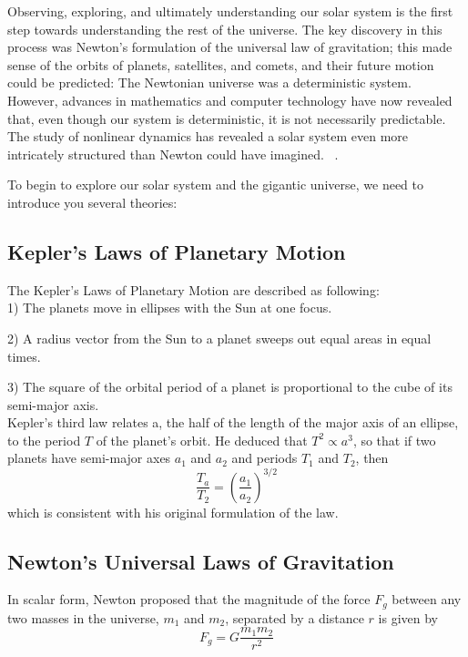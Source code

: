 Observing, exploring, and ultimately understanding our solar system is the first step towards understanding the rest of the universe. The key discovery in this process was Newton’s formulation of the universal law of gravitation; this made sense of the orbits of planets, satellites, and comets, and their future motion could be predicted: The Newtonian universe was a deterministic system. However, advances in mathematics and computer technology have now revealed that, even though our system is deterministic, it is not necessarily predictable. The study of nonlinear dynamics has revealed a solar system even more intricately structured than Newton could have imagined. ~\cite{99MurraySolarSys}.

To begin to explore our solar system and the gigantic universe, we need to introduce you several theories:

\subsection{Kepler's Laws of Planetary Motion}
\label{Kepler's Laws}
The Kepler's Laws of Planetary Motion are described as following: \\

1) The planets move in ellipses with the Sun at one focus.

2) A radius vector from the Sun to a planet sweeps out equal areas in
equal times.\label{Kepler Second Law}

3) The square of the orbital period of a planet is proportional to the cube of its semi-major axis. \\

Kepler’s third law relates a, the half of the length of the major axis of an ellipse, to the period $T$ of the planet’s orbit. He deduced that $T^2 \propto a^3$, so that if two planets have semi-major axes $a_1$ and $a_2$ and periods $T_1$ and $T_2$, then 
\begin{equation}
    \frac{T_a}{T_2} = (\frac{a_1}{a_2})^{3/2}
\end{equation}
which is consistent with his original formulation of the law. 

\subsection{Newton's Universal Laws of Gravitation}
In scalar form, Newton proposed that the magnitude of the force $F_g$ between any two masses in the universe, $m_1$ and $m_2$, separated by a distance $r$ is given by
\begin{equation}
F_{g} = G\frac{m_{1}m_{2}}{r^2}
\label{eq:unigrav}
\end{equation}

